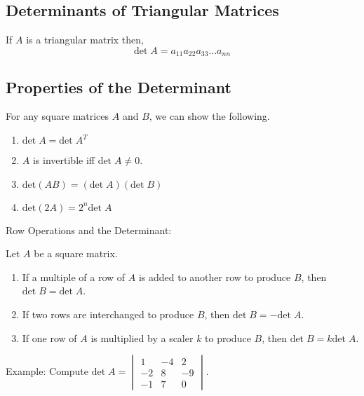 \subsection{Determinants of Triangular Matrices}
\begin{theorem}
    If \(A\) is a triangular matrix then,
    \[\text{det} \; A = a_{11} a_{22} a_{33} \dots a_{nn}\]
\end{theorem}

\subsection{Properties of the Determinant}
\begin{theorem}
    For any square matrices \(A\) and \(B\), we can show the following.
    \begin{enumerate}
        \item \(\text{det} \; A = \text{det} \; A^T\)
        \item \(A\) is invertible iff \(\text{det} \; A \ne 0\).
        \item \(\text{det} (A B)= (\text{det} \; A) (\text{det} \; B)\)
        \item \(\text{det} (2A) = 2^n \text{det} \; A\)
    \end{enumerate}
\end{theorem}

\begin{theorem}
    Row Operations and the Determinant:
    
    Let \(A\) be a square matrix.
    \begin{enumerate}
        \item If a multiple of a row of \(A\) is added to another row to produce \(B\), then \(\text{det} \; B = \text{det} \; A\).
        \item If two rows are interchanged to produce \(B\), then \(\text{det} \; B = -\text{det} \; A\).
        \item If one row of \(A\) is multiplied by a scaler \(k\) to produce \(B\), then \(\text{det} \; B = k \text{det} \; A\).
    \end{enumerate}
\end{theorem}

\noindent
\newline
Example: Compute \(\text{det} \; A=\begin{vmatrix}
    1 & -4 & 2 \\
    -2 & 8 & -9 \\
    -1 & 7 & 0
\end{vmatrix}\).


